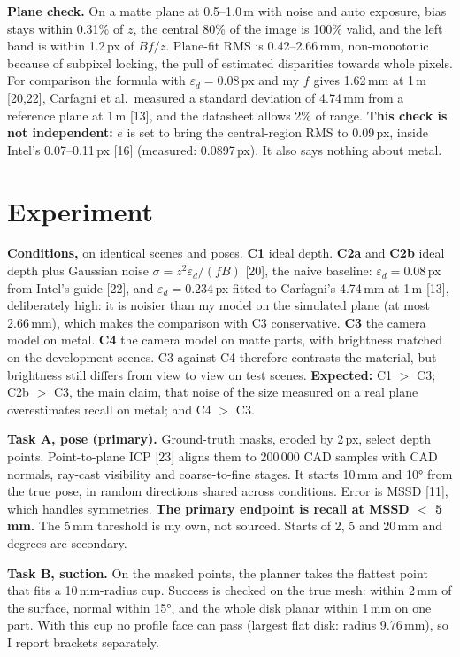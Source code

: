 \documentclass[10pt,a4paper]{article}
\newcommand{\para}[1]{\textbf{#1}\enspace}
\newcommand{\cte}[1]{[#1]}
\begin{document}
\para{Plane check.} On a matte plane at 0.5--1.0\,m with noise and auto exposure, bias stays within 0.31\% of $z$, the central 80\% of the image is 100\% valid, and the left band is within 1.2\,px of $B f/z$. Plane-fit RMS is 0.42--2.66\,mm, non-monotonic because of subpixel locking, the pull of estimated disparities towards whole pixels. For comparison the formula with $\varepsilon_d=0.08$\,px and my $f$ gives 1.62\,mm at 1\,m \cte{20,22}, Carfagni et al.\ measured a standard deviation of 4.74\,mm from a reference plane at 1\,m \cte{13}, and the datasheet allows 2\% of range. \textbf{This check is not independent:} $e$ is set to bring the central-region RMS to 0.09\,px, inside Intel's 0.07--0.11\,px \cte{16} (measured: 0.0897\,px). It also says nothing about metal.

\section{Experiment}
\para{Conditions,} on identical scenes and poses. \textbf{C1} ideal depth. \textbf{C2a} and \textbf{C2b} ideal depth plus Gaussian noise $\sigma=z^2\varepsilon_d/(fB)$ \cte{20}, the naive baseline: $\varepsilon_d=0.08$\,px from Intel's guide \cte{22}, and $\varepsilon_d=0.234$\,px fitted to Carfagni's 4.74\,mm at 1\,m \cte{13}, deliberately high: it is noisier than my model on the simulated plane (at most 2.66\,mm), which makes the comparison with C3 conservative. \textbf{C3} the camera model on metal. \textbf{C4} the camera model on matte parts, with brightness matched on the development scenes. C3 against C4 therefore contrasts the material, but brightness still differs from view to view on test scenes. \textbf{Expected:} C1 $>$ C3; C2b $>$ C3, the main claim, that noise of the size measured on a real plane overestimates recall on metal; and C4 $>$ C3.

\para{Task A, pose (primary).} Ground-truth masks, eroded by 2\,px, select depth points. Point-to-plane ICP \cte{23} aligns them to 200\,000 CAD samples with CAD normals, ray-cast visibility and coarse-to-fine stages. It starts 10\,mm and 10° from the true pose, in random directions shared across conditions. Error is MSSD \cte{11}, which handles symmetries. \textbf{The primary endpoint is recall at MSSD $<$ 5\,mm.} The 5\,mm threshold is my own, not sourced. Starts of 2, 5 and 20\,mm and degrees are secondary.

\para{Task B, suction.} On the masked points, the planner takes the flattest point that fits a 10\,mm-radius cup. Success is checked on the true mesh: within 2\,mm of the surface, normal within 15°, and the whole disk planar within 1\,mm on one part. With this cup no profile face can pass (largest flat disk: radius 9.76\,mm), so I report brackets separately.
\end{document}
